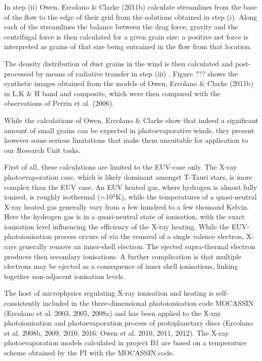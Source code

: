 \documentclass[10pt,fleqn,twoside]{article}
\makeatletter
\renewcommand\paragraph{\@startsection{paragraph}{4}{\z@}%
            {-2.5ex\@plus -1ex \@minus -.25ex}%
            {1.25ex \@plus .25ex}%
            {\normalfont\normalsize\bfseries}}
\makeatother
\begin{document}
In step (ii) Owen, Ercolano \& Clarke (2011b) calculate streamlines
from the base of the flow to the edge of their grid from the solutions
obtained in step (i). Along each of the streamlines the balance
between the drag force, gravity and the centrifugal force is then
calculated for a given grain size: a positive net force is interpreted
as grains of that size being entrained in the flow from that
location. 

The density distribution of dust grains in the wind is
then calculated and post-processed by means of radiative
transfer in step (iii) . Figure ??? shows the synthetic images 
obtained from the models of Owen, Ercolano \& Clarke (2011b) in L,K \&
H band and composite, which were then compared 
with the observations of Perrin et al. (2006). 


While the calculations of Owen, Ercolano \& Clarke show that indeed a
significant amount of small grains can be expected in photoevaporative
winds, they present however
some serious limitations that make them unsuitable for application to our Research
Unit tasks. 

First of all, these calculations are limited to the EUV-case only. The
X-ray photoevaporation case, which is likely dominant amongst T-Tauri
stars, is more complex than the EUV case. An EUV heated gas, where
hydrogen is almost fully ionised, is roughly isothermal
($\sim$10$^4$K), while the temperatures of a quasi-neutral X-ray
heated gas generally vary from a few hundred to a few thousand 
Kelvin. Here the hydrogen gas is in a quasi-neutral state of ionisation, with the
exact ionisation level influencing the efficiency of the X-ray
heating. While the EUV-photoionisation process occurs of via the removal
of a single valence electron, X-rays generally remove an inner-shell
electron. The ejected supra-thermal electron produces then secondary
ionisations. A further complication is that multiple electrons may be
ejected as a consequence of inner shell ionisations, linking together
non-adjacent ionisation levels.

 The host of microphysics regulating
X-ray ionisation and heating is self-consistently included in the
three-dimensional photoionisation code MOCASSIN (Ercolano et al. 2003,
2005, 2008a) and has been applied to the X-ray photoionisation and
photoevaporation process of protoplanetary discs (Ercolano et
al. 2008b, 2009, 2010, 2016; Owen et al. 2010, 2011, 2012). 
The X-ray photoevaporation models calculated in project B1 are based
on a temperature scheme obtained by the PI with the MOCASSIN code.
\end{document}
